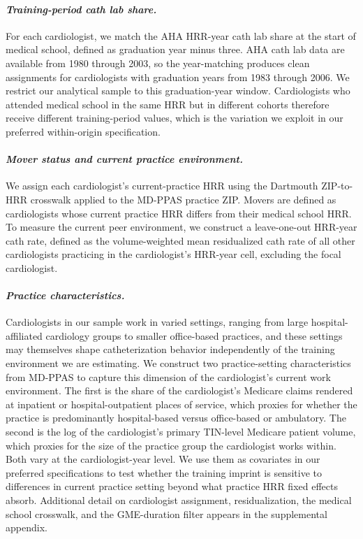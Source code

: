 \documentclass[12pt]{article}
\begin{document}
\paragraph{\textit{Training-period cath lab share.}}
For each cardiologist, we match the AHA HRR-year cath lab share at the start of medical school, defined as graduation year minus three. AHA cath lab data are available from 1980 through 2003, so the year-matching produces clean assignments for cardiologists with graduation years from 1983 through 2006. We restrict our analytical sample to this graduation-year window. Cardiologists who attended medical school in the same HRR but in different cohorts therefore receive different training-period values, which is the variation we exploit in our preferred within-origin specification.

\paragraph{\textit{Mover status and current practice environment.}}
We assign each cardiologist's current-practice HRR using the Dartmouth ZIP-to-HRR crosswalk applied to the MD-PPAS practice ZIP. Movers are defined as cardiologists whose current practice HRR differs from their medical school HRR. To measure the current peer environment, we construct a leave-one-out HRR-year cath rate, defined as the volume-weighted mean residualized cath rate of all other cardiologists practicing in the cardiologist's HRR-year cell, excluding the focal cardiologist.

\paragraph{\textit{Practice characteristics.}}
Cardiologists in our sample work in varied settings, ranging from large hospital-affiliated cardiology groups to smaller office-based practices, and these settings may themselves shape catheterization behavior independently of the training environment we are estimating. We construct two practice-setting characteristics from MD-PPAS to capture this dimension of the cardiologist's current work environment. The first is the share of the cardiologist's Medicare claims rendered at inpatient or hospital-outpatient places of service, which proxies for whether the practice is predominantly hospital-based versus office-based or ambulatory. The second is the log of the cardiologist's primary TIN-level Medicare patient volume, which proxies for the size of the practice group the cardiologist works within. Both vary at the cardiologist-year level. We use them as covariates in our preferred specifications to test whether the training imprint is sensitive to differences in current practice setting beyond what practice HRR fixed effects absorb. Additional detail on cardiologist assignment, residualization, the medical school crosswalk, and the GME-duration filter appears in the supplemental appendix.
\end{document}
